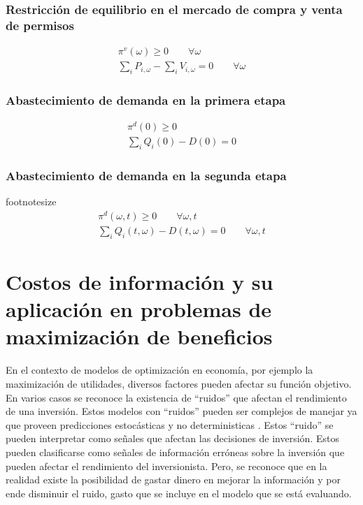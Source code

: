 \subsubsection{Restricción de equilibrio en el mercado de compra y venta de permisos}
\footnotesize{
\begin{align}
 \pi^v(\omega) \geq 0 \qquad \forall \omega\\
 \sum_{i}P_{i,\omega} - \sum_{i}V_{i,\omega} = 0 \qquad \forall \omega  
\end{align}}

\subsubsection{Abastecimiento de demanda en la primera etapa}
\footnotesize{
\begin{align}
 \pi^d(0) \geq 0 \\
 \sum_{i}Q_i(0) - D(0) = 0   
\end{align}}

\subsubsection{Abastecimiento de demanda en la segunda etapa}
footnotesize{
\begin{align}
 \pi^d(\omega,t) \geq 0 \qquad \forall \omega,t\\
 \sum_{i}Q_i(t,\omega) - D(t,\omega) = 0 \qquad \forall \omega,t  
\end{align}}



\section{Costos de información y su aplicación en problemas de maximización de beneficios}\label{marco:costos}

En el contexto de modelos de optimización en economía, por ejemplo la maximización de utilidades, diversos factores pueden afectar su función objetivo. En varios casos se reconoce la existencia de ``ruidos'' que afectan el rendimiento de una inversión. Estos modelos con ``ruidos'' pueden ser complejos de manejar ya que proveen predicciones estocásticas y no deterministicas . Estos ``ruido'' se pueden interpretar como señales que afectan las decisiones de inversión. Estos pueden clasificarse como señales de información erróneas sobre la inversión que pueden afectar el rendimiento del inversionista. Pero, se reconoce que en la realidad existe la posibilidad de gastar dinero en mejorar la información y por ende disminuir el ruido, gasto que se incluye en el modelo que se está evaluando.
\vspace{2.5mm}

